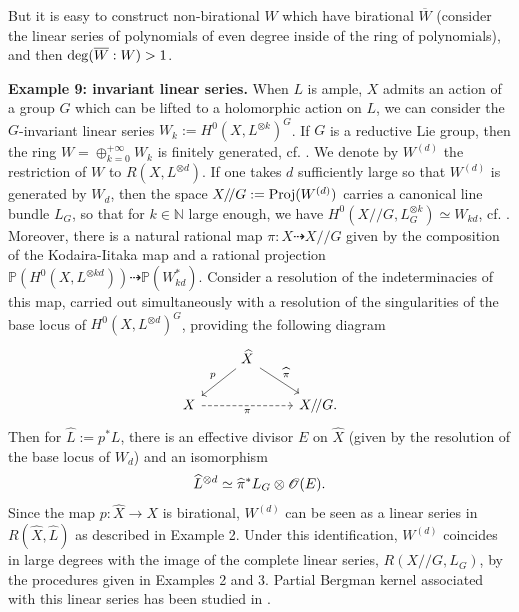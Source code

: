 \documentclass[12pt]{article}
\numberwithin{equation}{section}
\theoremstyle{theorem}
\theoremstyle{definition}
\theoremstyle{remark}
\newcommand{\nat}{\mathbb{N}}
\begin{document}
	But it is easy to construct non-birational $W$ which have birational $\overline{W}$ (consider the linear series of polynomials of even degree inside of the ring of polynomials), and then ${\rm{deg}}(\overline{W} : W) > 1$.
	\par 
	\textbf{Example 9: invariant linear series.}
	When $L$ is ample, $X$ admits an action of a group $G$ which can be lifted to a holomorphic action on $L$, we can consider the $G$-invariant linear series $W_k := H^0(X,L^{\otimes k})^G$.
	If $G$ is a reductive Lie group, then the ring $W = \oplus_{k = 0}^{+ \infty} W_k$ is finitely generated, cf. \cite[\S 1]{MumfordGIT}.
	We denote by $W^{(d)}$ the restriction of $W$ to $R(X, L^{\otimes d})$.
	If one takes $d$ sufficiently large so that $W^{(d)}$ is generated by $W_d$, then the space $X /\!/ G := {\rm{Proj}} (W^{(d)})$ carries a canonical line bundle $L_G$, so that for $k \in \nat$ large enough, we have $H^0(X /\!/ G, L_G^{\otimes k}) \simeq W_{kd}$, cf. \cite[Exercise II.5.14]{HartsBook}.
	Moreover, there is a natural rational map $\pi : X \dashrightarrow  X /\!/ G$ given by the composition of the Kodaira-Iitaka map and a rational projection $\mathbb{P}(H^0(X, L^{\otimes kd})) \dashrightarrow \mathbb{P}(W_{kd}^*)$.
	Consider a resolution of the indeterminacies of this map, carried out simultaneously with a resolution of the singularities of the base locus of $H^0(X, L^{\otimes d})^G$, providing the following diagram
	\begin{equation}\label{eq_resol_ind}
		\begin{tikzcd}
		& \widehat{X} \arrow[dl, "p"'] \arrow[dr, "\widehat{{\rm{\pi}}}"] & \\
		X \arrow[rr, dashed, "\pi"'] & & X /\!/ G.
		\end{tikzcd}
	\end{equation}
	Then for $\widehat{L} := p^* L$, there is an effective divisor $E$ on $\widehat{X}$ (given by the resolution of the base locus of $W_d$) and an isomorphism
	\begin{equation}
		\widehat{L}^{\otimes d}
		\simeq 
		\widehat{{\rm{\pi}}}^* L_G \otimes \mathscr{O}(E).
	\end{equation}
	Since the map $p: \widehat{X} \to X$ is birational, $W^{(d)}$ can be seen as a linear series in $R(\widehat{X}, \widehat{L})$ as described in Example 2.
	Under this identification, $W^{(d)}$ coincides in large degrees with the image of the complete linear series, $R(X /\!/ G, L_G)$, by the procedures given in Examples 2 and 3.
	Partial Bergman kernel associated with this linear series has been studied in \cite{MaZhBKSR}.
\end{document}
